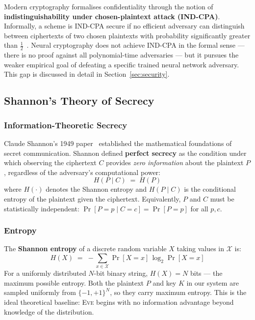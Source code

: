 \documentclass[12pt, a4paper]{article}
\newcommand{\eve}{\textsc{Eve}}
\begin{document}
Modern cryptography formalises confidentiality through the notion of
\textbf{indistinguishability under chosen-plaintext attack (IND-CPA)}.
Informally, a scheme is IND-CPA secure if no efficient adversary can
distinguish between ciphertexts of two chosen plaintexts with probability
significantly greater than $\tfrac{1}{2}$~\cite{goldwasser1984probabilistic}.
Neural cryptography does not achieve IND-CPA in the formal sense — there
is no proof against all polynomial-time adversaries — but it pursues the
weaker empirical goal of defeating a specific trained neural network
adversary. This gap is discussed in detail in Section~\ref{sec:security}.

\subsection{Shannon's Theory of Secrecy}
\label{subsec:shannon}

\subsubsection*{Information-Theoretic Secrecy}

Claude Shannon's 1949 paper~\cite{shannon1949communication} established
the mathematical foundations of secret communication. Shannon defined
\textbf{perfect secrecy} as the condition under which observing the
ciphertext $C$ provides \emph{zero information} about the plaintext $P$,
regardless of the adversary's computational power:
%
\begin{equation}
  H(P \mid C) \;=\; H(P)
  \label{eq:perfect_secrecy}
\end{equation}
%
where $H(\cdot)$ denotes the Shannon entropy and $H(P \mid C)$ is the
conditional entropy of the plaintext given the ciphertext. Equivalently,
$P$ and $C$ must be statistically independent:
$\Pr[P = p \mid C = c] = \Pr[P = p]$ for all $p, c$.

\subsubsection*{Entropy}

The \textbf{Shannon entropy} of a discrete random variable $X$ taking
values in $\mathcal{X}$ is:
%
\begin{equation}
  H(X) \;=\; -\sum_{x \in \mathcal{X}} \Pr[X=x]\,\log_2 \Pr[X=x]
  \label{eq:entropy}
\end{equation}
%
For a uniformly distributed $N$-bit binary string, $H(X) = N$ bits — the
maximum possible entropy. Both the plaintext $P$ and key $K$ in our system
are sampled uniformly from $\{-1,+1\}^N$, so they carry maximum entropy.
This is the ideal theoretical baseline: \eve{} begins with no information
advantage beyond knowledge of the distribution.
\end{document}
